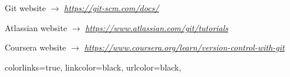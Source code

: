 \documentclass[a4paper,portrait,10pt]{article}   %
\newcommand{\myvspace}{\vspace{4mm}}   %
\newcommand{\myurl}[2]{\href{{#1}}{\underline{\textit{#2}}}}   %
\begin{document}

\begin{thebibliography}{99} %

 Git website $\rightarrow$ \myurl{https://git-scm.com/docs/}{https://git-scm.com/docs/}

 Atlassian website $\rightarrow$ \myurl{https://www.atlassian.com/git/tutorials}{https://www.atlassian.com/git/tutorials}

 Coursera website $\rightarrow$ \myurl{https://www.coursera.org/learn/version-control-with-git}{https://www.coursera.org/learn/version-control-with-git}

\end{thebibliography}
\myvspace



\hypersetup
{
  colorlinks=true,
  linkcolor=black,   %
  urlcolor=black,   %
}
\pagebreak
\tableofcontents{}
\end{document}
